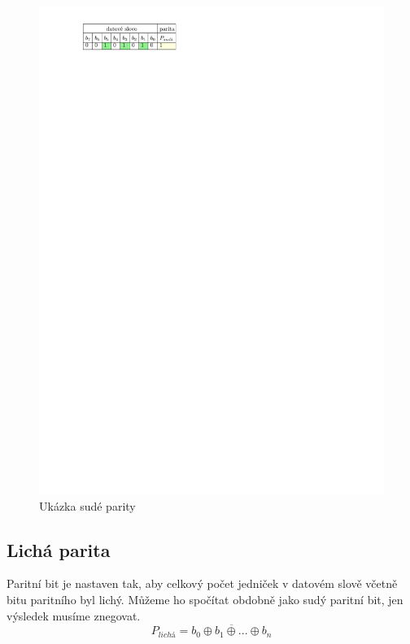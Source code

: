\begin{figure}[H]
    \begin{center}
        \includegraphics[scale=1]{img/parita_suda}
    \end{center}
    \caption{Ukázka sudé parity}
\end{figure}

\subsection{Lichá parita}
Paritní bit je nastaven tak, aby celkový počet jedniček v datovém slově včetně bitu paritního byl lichý. Můžeme ho spočítat obdobně jako sudý paritní bit, jen výsledek musíme znegovat.
$$ P_{lichá} = \overline{ b_0 \oplus b_1 \oplus ... \oplus b_n } $$

